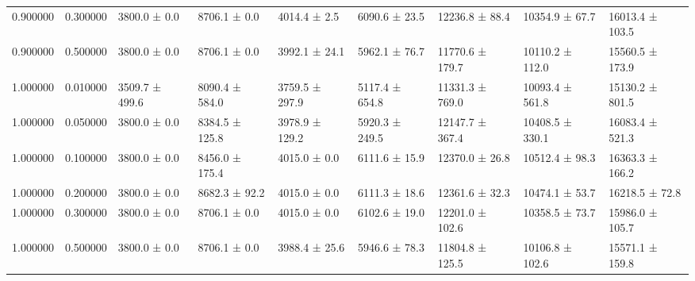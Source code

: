 \begin{table}
\begin{tabular}{rrlllllll}
0.900000 & 0.300000 & 3800.0 ± 0.0 & 8706.1 ± 0.0 & 4014.4 ± 2.5 & 6090.6 ± 23.5 & 12236.8 ± 88.4 & 10354.9 ± 67.7 & 16013.4 ± 103.5 \\
0.900000 & 0.500000 & 3800.0 ± 0.0 & 8706.1 ± 0.0 & 3992.1 ± 24.1 & 5962.1 ± 76.7 & 11770.6 ± 179.7 & 10110.2 ± 112.0 & 15560.5 ± 173.9 \\
1.000000 & 0.010000 & 3509.7 ± 499.6 & 8090.4 ± 584.0 & 3759.5 ± 297.9 & 5117.4 ± 654.8 & 11331.3 ± 769.0 & 10093.4 ± 561.8 & 15130.2 ± 801.5 \\
1.000000 & 0.050000 & 3800.0 ± 0.0 & 8384.5 ± 125.8 & 3978.9 ± 129.2 & 5920.3 ± 249.5 & 12147.7 ± 367.4 & 10408.5 ± 330.1 & 16083.4 ± 521.3 \\
1.000000 & 0.100000 & 3800.0 ± 0.0 & 8456.0 ± 175.4 & 4015.0 ± 0.0 & 6111.6 ± 15.9 & 12370.0 ± 26.8 & 10512.4 ± 98.3 & 16363.3 ± 166.2 \\
1.000000 & 0.200000 & 3800.0 ± 0.0 & 8682.3 ± 92.2 & 4015.0 ± 0.0 & 6111.3 ± 18.6 & 12361.6 ± 32.3 & 10474.1 ± 53.7 & 16218.5 ± 72.8 \\
1.000000 & 0.300000 & 3800.0 ± 0.0 & 8706.1 ± 0.0 & 4015.0 ± 0.0 & 6102.6 ± 19.0 & 12201.0 ± 102.6 & 10358.5 ± 73.7 & 15986.0 ± 105.7 \\
1.000000 & 0.500000 & 3800.0 ± 0.0 & 8706.1 ± 0.0 & 3988.4 ± 25.6 & 5946.6 ± 78.3 & 11804.8 ± 125.5 & 10106.8 ± 102.6 & 15571.1 ± 159.8 \\
\bottomrule
\end{tabular}
\end{table}
